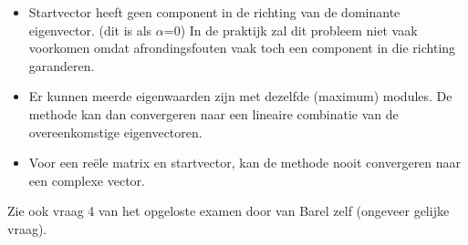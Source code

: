 \begin{itemize}
\item Startvector heeft geen component in de richting van de dominante eigenvector. (dit is als $\alpha$=0) In de praktijk zal dit probleem niet vaak voorkomen omdat afrondingsfouten vaak toch een component in die richting garanderen.
\item Er kunnen meerde eigenwaarden zijn met dezelfde (maximum) modules. De methode kan dan convergeren naar een lineaire combinatie van de overeenkomstige eigenvectoren.
\item Voor een re\"ele matrix en startvector, kan de methode nooit convergeren naar een complexe vector.
\end{itemize}
Zie ook vraag 4 van het opgeloste examen door van Barel zelf (ongeveer gelijke vraag).
